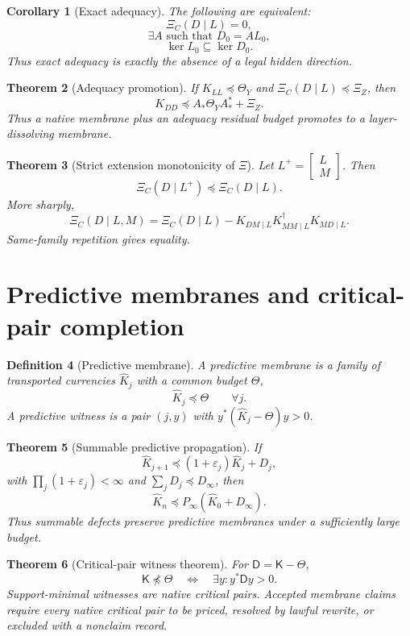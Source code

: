 \documentclass[11pt]{article}
\newtheorem{theorem}{Theorem}[section]
\newtheorem{corollary}[theorem]{Corollary}
\newtheorem{definition}[theorem]{Definition}
\newcommand{\K}{\mathsf K}
\newcommand{\Loewner}{\preceq}
\begin{document}
\begin{corollary}[Exact adequacy]
The following are equivalent:
\[
  \Xi_C(D\mid L)=0,
\]
\[
  \exists A\text{ such that }D_0=AL_0,
\]
\[
  \ker L_0\subseteq\ker D_0.
\]
Thus exact adequacy is exactly the absence of a legal hidden direction.
\end{corollary}

\begin{theorem}[Adequacy promotion]
If \(K_{LL}\Loewner\Theta_Y\) and \(\Xi_C(D\mid L)\Loewner\Xi_Z\), then
\[
  K_{DD}\Loewner A_*\Theta_YA_*^*+\Xi_Z.
\]
Thus a native membrane plus an adequacy residual budget promotes to a layer-dissolving membrane.
\end{theorem}

\begin{theorem}[Strict extension monotonicity of \(\Xi\)]
Let \(L^+=\begin{bmatrix}L\\M\end{bmatrix}\).  Then
\[
  \Xi_C(D\mid L^+)\Loewner\Xi_C(D\mid L).
\]
More sharply,
\[
  \Xi_C(D\mid L,M)=\Xi_C(D\mid L)-K_{DM\mid L}K_{MM\mid L}^\dagger K_{MD\mid L}.
\]
Same-family repetition gives equality.
\end{theorem}

\section{Predictive membranes and critical-pair completion}

\begin{definition}[Predictive membrane]
A predictive membrane is a family of transported currencies \(\widehat K_j\) with a common budget \(\Theta\),
\[
  \widehat K_j\Loewner\Theta\qquad\forall j.
\]
A predictive witness is a pair \((j,y)\) with \(y^*(\widehat K_j-\Theta)y>0\).
\end{definition}

\begin{theorem}[Summable predictive propagation]
If
\[
  \widehat K_{j+1}\Loewner(1+\varepsilon_j)\widehat K_j+D_j,
\]
with \(\prod_j(1+\varepsilon_j)<\infty\) and \(\sum_jD_j\Loewner D_\infty\), then
\[
  \widehat K_n\Loewner P_\infty(\widehat K_0+D_\infty).
\]
Thus summable defects preserve predictive membranes under a sufficiently large budget.
\end{theorem}

\begin{theorem}[Critical-pair witness theorem]
For \(\mathsf D=\K-\Theta\),
\[
  \K\npreceq\Theta\quad\Longleftrightarrow\quad\exists y:y^*\mathsf Dy>0.
\]
Support-minimal witnesses are native critical pairs.  Accepted membrane claims require every native critical pair to be priced, resolved by lawful rewrite, or excluded with a nonclaim record.
\end{theorem}
\end{document}
